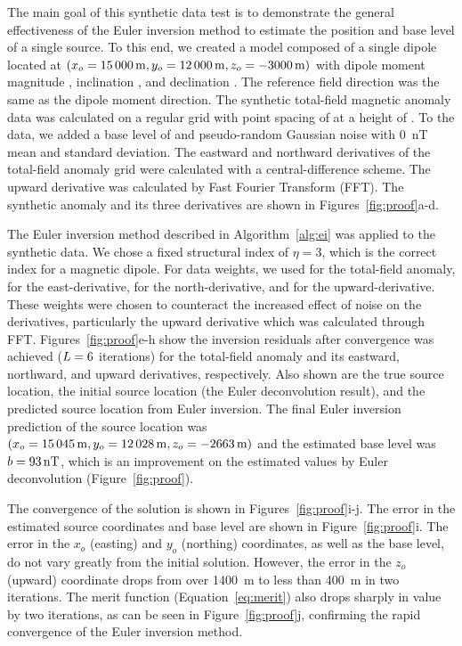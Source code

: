 The main goal of this synthetic data test is to demonstrate the general effectiveness of the Euler inversion method to estimate the position and base level of a single source.
To this end, we created a model composed of a single dipole located at
$(x_o = \SynProofTrueEast, y_o = \SynProofTrueNorth, z_o = \SynProofTrueUp)$
with dipole moment magnitude \SynProofInt{}, inclination \SynProofInc{}, and declination \SynProofDec{}.
The reference field direction was the same as the dipole moment direction.
The synthetic total-field magnetic anomaly data was calculated on a regular grid
with point spacing of \SynProofSpacing{} at a height of \SynProofHeight{}.
To the data, we added a base level of \SynProofTrueBase{} and
pseudo-random Gaussian noise with \qty{0}{\nano\tesla} mean and \SynProofNoise{} standard deviation.
The eastward and northward derivatives of the total-field anomaly grid were calculated with a central-difference scheme.
The upward derivative was calculated by Fast Fourier Transform (FFT).
The synthetic anomaly and its three derivatives are shown in Figures~\ref{fig:proof}a-d.

The Euler inversion method described in Algorithm~\ref{alg:ei} was applied to the synthetic data.
We chose a fixed structural index of $\eta=3$, which is the correct index for a magnetic dipole.
For data weights, we used \DefaultWeightsF{} for the total-field anomaly, \DefaultWeightsE{} for the east-derivative, \DefaultWeightsN{} for the north-derivative, and \DefaultWeightsU{} for the upward-derivative.
These weights were chosen to counteract the increased effect of noise on the derivatives, particularly the upward derivative which was calculated through FFT.
Figures~\ref{fig:proof}e-h show the inversion residuals after convergence was achieved ($L=6{}$ iterations) for the total-field anomaly and its eastward, northward, and upward derivatives, respectively.
Also shown are the true source location, the initial source location (the Euler deconvolution result), and the predicted source location from Euler inversion.
The final Euler inversion prediction of the source location was $(x_o=\SynProofEstEast, y_o=\SynProofEstNorth, z_o=\SynProofEstUp)$ and the estimated base level was $b = \qty{93}{\nano\tesla}$, which is an improvement on the estimated values by Euler deconvolution (Figure~\ref{fig:proof}).

The convergence of the solution is shown in Figures~\ref{fig:proof}i-j.
The error in the estimated source coordinates and base level are shown in Figure~\ref{fig:proof}i.
The error in the $x_o$ (easting) and $y_o$ (northing) coordinates, as well as the base level, do not vary greatly from the initial solution.
However, the error in the $z_o$ (upward) coordinate drops from over \qty{1400}{\m} to less than \qty{400}{\m} in two iterations.
The merit function (Equation~\ref{eq:merit}) also drops sharply in value by two iterations, as can be seen in Figure~\ref{fig:proof}j, confirming the rapid convergence of the Euler inversion method.


